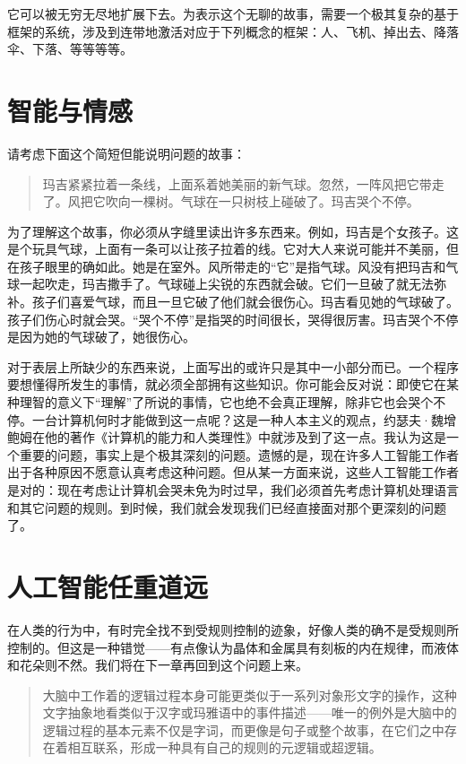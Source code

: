 它可以被无穷无尽地扩展下去。为表示这个无聊的故事，需要一个极其复杂的基于框架的系统，涉及到连带地激活对应于下列概念的框架：人、飞机、掉出去、降落伞、下落、等等等等。

\section{智能与情感}

请考虑下面这个简短但能说明问题的故事：

\begin{quote}
玛吉紧紧拉着一条线，上面系着她美丽的新气球。忽然，一阵风把它带走了。风把它吹向一棵树。气球在一只树枝上碰破了。玛吉哭个不停。
\end{quote}

为了理解这个故事，你必须从字缝里读出许多东西来。例如，玛吉是个女孩子。这是个玩具气球，上面有一条可以让孩子拉着的线。它对大人来说可能并不美丽，但在孩子眼里的确如此。她是在室外。风所带走的“它”是指气球。风没有把玛吉和气球一起吹走，玛吉撒手了。气球碰上尖锐的东西就会破。它们一旦破了就无法弥补。孩子们喜爱气球，而且一旦它破了他们就会很伤心。玛吉看见她的气球破了。孩子们伤心时就会哭。“哭个不停”是指哭的时间很长，哭得很厉害。玛吉哭个不停是因为她的气球破了，她很伤心。

对于表层上所缺少的东西来说，上面写出的或许只是其中一小部分而已。一个程序要想懂得所发生的事情，就必须全部拥有这些知识。你可能会反对说：即使它在某种理智的意义下“理解”了所说的事情，它也绝不会真正理解，除非它也会哭个不停。一台计算机何时才能做到这一点呢？这是一种人本主义的观点，约瑟夫·魏增鲍姆在他的著作《计算机的能力和人类理性》中就涉及到了这一点。我认为这是一个重要的问题，事实上是个极其深刻的问题。遗憾的是，现在许多人工智能工作者出于各种原因不愿意认真考虑这种问题。但从某一方面来说，这些人工智能工作者是对的：现在考虑让计算机会哭未免为时过早，我们必须首先考虑计算机处理语言和其它问题的规则。到时候，我们就会发现我们已经直接面对那个更深刻的问题了。

\section{人工智能任重道远}

在人类的行为中，有时完全找不到受规则控制的迹象，好像人类的确不是受规则所控制的。但这是一种错觉——有点像认为晶体和金属具有刻板的内在规律，而液体和花朵则不然。我们将在下一章再回到这个问题上来。

\begin{quote}
大脑中工作着的逻辑过程本身可能更类似于一系列对象形文字的操作，这种文字抽象地看类似于汉字或玛雅语中的事件描述——唯一的例外是大脑中的逻辑过程的基本元素不仅是字词，而更像是句子或整个故事，在它们之中存在着相互联系，形成一种具有自己的规则的元逻辑或超逻辑。
\end{quote}

